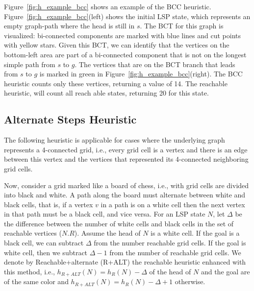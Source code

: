 \documentclass[letterpaper]{article} %
\newcommand\Yossi[1]{\nb{\textbf{Yossi:}}{green}{#1}}
\newcommand\Roni[1]{\nb{\textbf{Roni:}}{blue}{#1}}
\begin{document}
Figure~\ref{fig:h_example_bcc} shows an example of the BCC heuristic. 
Figure~\ref{fig:h_example_bcc}(left) shows the initial LSP state, which represents an empty graph-path where the head is still in $s$. The BCT for this graph is visualized: bi-connected components are marked with blue lines and cut points with yellow stars.  
Given this BCT, we can identify that the vertices on the bottom-left area are part of a bi-connected component that is not on the longest simple path from $s$ to $g$. 
The vertices that are on the BCT branch that leads from $s$ to $g$ is marked in green in Figure~\ref{fig:h_example_bcc}(right). The BCC heuristic counts only these vertices, returning a value of 14. The reachable heuristic, will count all reach able states, returning 20 for this state. 

\subsection{Alternate Steps Heuristic}

The following heuristic is applicable for cases where the underlying graph 
represents a 4-connected grid, i.e., every grid cell is a vertex and there is an edge between this vertex and the vertices that represented its 4-connected neighboring grid cells. 


Now, consider a grid marked like a board of chess, i.e., with grid cells are divided into black and white. A path along the board must alternate between white and black cells, that is, 
if a vertex $v$ in a path is on a white cell then the next vertex in that path must be a black cell, and vice versa. For an LSP state $N$, let $\Delta$ be the difference between the number of white cells and black cells in the set of reachable vertices ($N.R$). 
Assume the head of $N$ is a white cell. If the goal is a black cell, we can subtract $\Delta$ from the number reachable grid cells. If the goal is white cell, then we subtract $\Delta - 1$ 
from the number of reachable grid cells. 
We denote by Reachable+alternate (R+ALT) the reachable heuristic enhanced with this method, 
i.e., $h_{R+ALT}(N)=h_R(N)-\Delta$ of the head of $N$ and the goal are of the same color
and $h_{R+ALT}(N)=h_R(N)-\Delta+1$ otherwise. 

\end{document}
